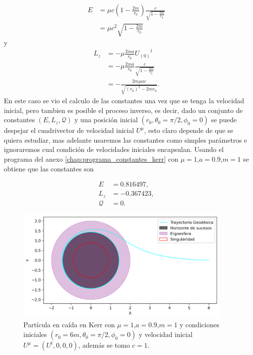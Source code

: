 \begin{equation}
    \begin{aligned}
        E & =  \mu c \left(1-\frac{2 m }{r_0}\right)\frac{c}{\sqrt{1-\frac{2 m }{r_0}}} \\
          & = \mu c^2 \sqrt{1-\frac{2 m }{r_0}}
    \end{aligned}
\end{equation}
y
\begin{equation}
    \begin{aligned}
        L_z & = -\mu \frac{2 m a }{r_0}{U_{(0)}}^t                        \\
            & =-\mu \frac{2 m a}{r_0} \frac{c}{\sqrt{1-\frac{2 m }{r_0}}} \\
            & = -\frac{2 m \mu  a c}{ \sqrt{(r_0)^2-2 m r_0}}.
    \end{aligned}
\end{equation}
En este caso se vio el calculo de las constantes una vez que se tenga la velocidad inicial, pero tambien es posible el proceso inverso, es decir, dado un conjunto de constantes $(E, L_z, \mathcal{Q})$ y una posición inicial $(r_0, \theta_0=\pi/2, \phi_0=0)$ se puede despejar el cuadrivector de velocidad inicial $U^\mu$, esto claro depende de que se quiera estudiar, mas adelante usaremos las constantes como simples parámetros e ignoraremos cual condición de velocidades iniciales encapsulan.
Usando el programa del anexo \ref{chap:programa_constantes_kerr} con $\mu=1$,$a = 0.9$,$m=1$ se obtiene que las constantes son

\begin{align*}
    E           & = 0.816497 ,  \\
    L_z         & =  -0.367423, \\
    \mathcal{Q} & = 0.
\end{align*}

\begin{figure}[H]
    \begin{small}
        \begin{center}
            \includegraphics[width=0.95\textwidth]{AgujerosNegros/kerr/geodesics_plots/Geodesica_caida_planoxy.png}
        \end{center}
        \caption{Partícula en caída en Kerr con $\mu=1$,$a = 0.9$,$m=1$ y condiciones iniciales $(r_0=6m, \theta_0=\pi/2, \phi_0=0)$ y velocidad inicial $U^\mu = (U^t, 0, 0, 0 )$, además se tomo $c=1$.}
    \end{small}
\end{figure}


